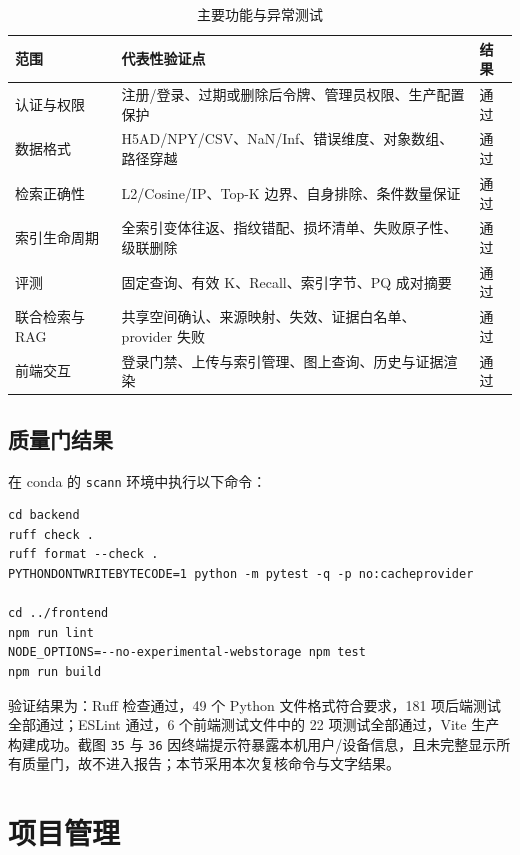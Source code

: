\documentclass[11pt,a4paper]{article}
\newcommand{\code}[1]{\texttt{#1}}
\begin{document}
\begin{table}[htbp]
  \centering
  \caption{主要功能与异常测试}
  \label{tab:function-tests}
  \begin{tabularx}{\textwidth}{p{}Y p{0.15\textwidth}}
    \toprule
    范围 & 代表性验证点 & 结果 \\
    \midrule
    认证与权限 & 注册/登录、过期或删除后令牌、管理员权限、生产配置保护 & 通过 \\
    数据格式 & H5AD/NPY/CSV、NaN/Inf、错误维度、对象数组、路径穿越 & 通过 \\
    检索正确性 & L2/Cosine/IP、Top-K 边界、自身排除、条件数量保证 & 通过 \\
    索引生命周期 & 全索引变体往返、指纹错配、损坏清单、失败原子性、级联删除 & 通过 \\
    评测 & 固定查询、有效 K、Recall、索引字节、PQ 成对摘要 & 通过 \\
    联合检索与 RAG & 共享空间确认、来源映射、失效、证据白名单、provider 失败 & 通过 \\
    前端交互 & 登录门禁、上传与索引管理、图上查询、历史与证据渲染 & 通过 \\
    \bottomrule
  \end{tabularx}
\end{table}

\subsection{质量门结果}

在 conda 的 \code{scann} 环境中执行以下命令：

\begin{lstlisting}
cd backend
ruff check .
ruff format --check .
PYTHONDONTWRITEBYTECODE=1 python -m pytest -q -p no:cacheprovider

cd ../frontend
npm run lint
NODE_OPTIONS=--no-experimental-webstorage npm test
npm run build
\end{lstlisting}

验证结果为：Ruff 检查通过，49 个 Python 文件格式符合要求，181 项后端测试全部通过；ESLint 通过，6 个前端测试文件中的 22 项测试全部通过，Vite 生产构建成功。截图 \code{35} 与 \code{36} 因终端提示符暴露本机用户/设备信息，且未完整显示所有质量门，故不进入报告；本节采用本次复核命令与文字结果。

\section{项目管理}
\end{document}
